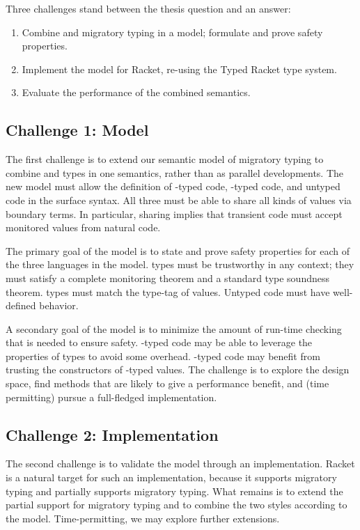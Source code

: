 Three challenges stand between the thesis question and an answer:

\begin{enumerate}
\item Combine \tdeep{} and \tshallow{} migratory typing in a model; formulate and prove safety properties.
\item Implement the model for Racket, re-using the Typed Racket type system.
\item Evaluate the performance of the combined semantics.
\end{enumerate}

\subsection{Challenge 1: Model}

The first challenge is to extend our semantic model of migratory typing to combine
 \tdeep{} and \tshallow{} types in one semantics, rather than as parallel
 developments.
The new model must allow the definition of \tdeep{}-typed code,
 \tshallow{}-typed code, and untyped code in the surface syntax.
All three must be able to share all kinds of values via boundary terms.
In particular, sharing implies that transient code must accept monitored
 values from natural code.
 
The primary goal of the model is to state and prove safety properties for each
 of the three languages in the model.
\tDeep{} types must be trustworthy in any context; they must satisfy a complete
 monitoring theorem and a standard type soundness theorem.
\tShallow{} types must match the type-tag of values.
Untyped code must have well-defined behavior.

A secondary goal of the model is to minimize the amount of run-time checking
 that is needed to ensure safety.
\tShallow{}-typed code may be able to leverage the properties of \tdeep{} types
 to avoid some overhead.
\tDeep{}-typed code may benefit from trusting the constructors of \tshallow{}-typed
 values.
The challenge is to explore the design space, find methods that are likely to
 give a performance benefit, and (time permitting) pursue a full-fledged implementation.


\subsection{Challenge 2: Implementation}

The second challenge is to validate the model through an implementation.
Racket is a natural target for such an implementation, because it supports
 \tdeep{} migratory typing and partially supports \tshallow{} migratory typing.
What remains is to extend the partial support for \tshallow{} migratory typing
 and to combine the two styles according to the model.
Time-permitting, we may explore further extensions.


